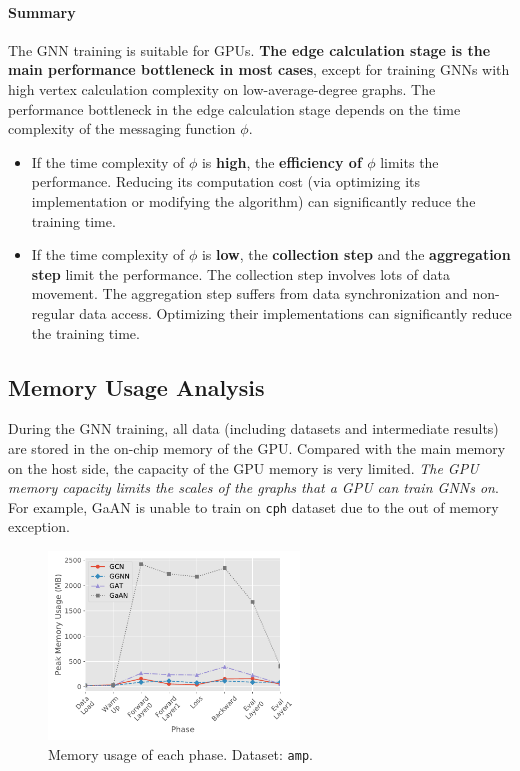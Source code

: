 \paragraph{Summary}
The GNN training is suitable for GPUs.
\textbf{The edge calculation stage is the main performance bottleneck in most cases}, except for training GNNs with high vertex calculation complexity on low-average-degree graphs.
The performance bottleneck in the edge calculation stage depends on the time complexity of the messaging function $\phi$.
\begin{itemize}
    \item If the time complexity of $\phi$ is \textbf{high}, the \textbf{efficiency of $\phi$} limits the performance. Reducing its computation cost (via optimizing its implementation or modifying the algorithm) can significantly reduce the training time.
    \item If the time complexity of $\phi$ is \textbf{low}, the \textbf{collection step} and the \textbf{aggregation step} limit the performance. The collection step involves lots of data movement. The aggregation step suffers from data synchronization and non-regular data access. Optimizing their implementations can significantly reduce the training time.
\end{itemize}

\subsection{Memory Usage Analysis}
\label{sec:memory_usage_analysis}

During the GNN training, all data (including datasets and intermediate results) are stored in the on-chip memory of the GPU.
Compared with the main memory on the host side, the capacity of the GPU memory is very limited.
\emph{The GPU memory capacity limits the scales of the graphs that a GPU can train GNNs on}.
For example, GaAN is unable to train on \texttt{cph} dataset due to the out of memory exception.

\begin{figure}[tbp]
    \centering
    \includegraphics[height=5cm]{figs/experiments/exp_memory_usage_stage_amp.pdf}
    \caption{Memory usage of each phase. Dataset: \texttt{amp}.}
    \label{fig:exp_memory_usage_stage_amp}
\end{figure}

